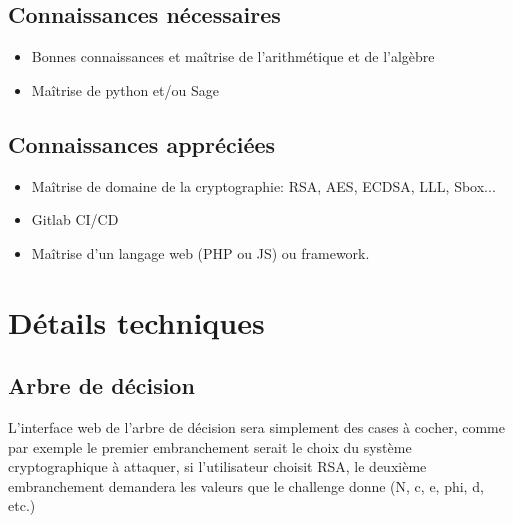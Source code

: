 \documentclass[12pt]{article}
\begin{document}
    \subsection{Connaissances nécessaires}
    \begin{itemize}
        \item{Bonnes connaissances et maîtrise de l'arithmétique et de l'algèbre}
        \item{Maîtrise de python et/ou Sage}
    \end{itemize}

	\subsection{Connaissances appréciées}
	\begin{itemize}
		\item Maîtrise de domaine de la cryptographie: RSA, AES, ECDSA, LLL, Sbox...
		\item Gitlab CI/CD
		\item Maîtrise d'un langage web (PHP ou JS) ou framework.
	\end{itemize}

    \section{Détails techniques}
    \subsection{Arbre de décision}
    L'interface web de l'arbre de décision sera simplement des cases à cocher, comme par exemple le premier embranchement serait le choix du système cryptographique à attaquer, si l'utilisateur choisit RSA, le deuxième embranchement demandera les valeurs que le challenge donne (N, c, e, phi, d, etc.)
\end{document}
